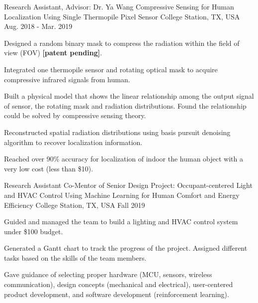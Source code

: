 \begin{cventries}
  \cventry
    {Research Assistant, Advisor: Dr. Ya Wang} %
    {Compressive Sensing for Human Localization Using Single Thermopile Pixel Sensor} %
    {College Station, TX, USA} %
    {Aug. 2018 - Mar. 2019} %
    {
      \begin{cvitems} %
        \item Designed a random binary mask to compress the radiation within the field of view (FOV) \textbf{[patent pending]}.
        \item Integrated one thermopile sensor and rotating optical mask to acquire compressive infrared signals from human.
        \item Built a physical model that shows the linear relationship among the output signal of sensor, the rotating mask and radiation distributions. Found the relationship could be solved by compressive sensing theory.
        \item Reconstructed spatial radiation distributions using basis pursuit denoising algorithm to recover localization information.
        \item Reached over 90\% accuracy for localization of indoor the human object with a very low cost (less than \$10).
      \end{cvitems}
    }

  \cventry
    {Research Assistant} %
    {Co-Mentor of Senior Design Project: Occupant-centered Light and HVAC Control Using Machine Learning for Human Comfort and Energy Efficiency} %
    {College Station, TX, USA} %
    {Fall 2019} %
    {
      \begin{cvitems} %
        \item Guided and managed the team to build a lighting and HVAC control system under \$100 budget. 
        \item Generated a Gantt chart to track the progress of the project. Assigned different tasks based on the skills of the team members.
        \item Gave guidance of selecting proper hardware (MCU, sensors, wireless communication), design concepts (mechanical and electrical), user-centered product development, and software development (reinforcement learning).
      \end{cvitems}
    }


\end{cventries}
